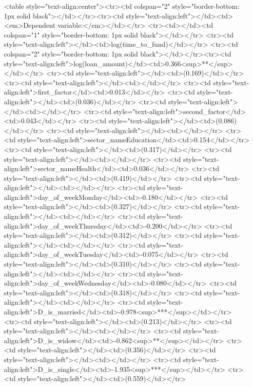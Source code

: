 
<table style="text-align:center"><tr><td colspan="2" style="border-bottom: 1px solid black"></td></tr><tr><td style="text-align:left"></td><td><em>Dependent variable:</em></td></tr>
<tr><td></td><td colspan="1" style="border-bottom: 1px solid black"></td></tr>
<tr><td style="text-align:left"></td><td>log(time_to_fund)</td></tr>
<tr><td colspan="2" style="border-bottom: 1px solid black"></td></tr><tr><td style="text-align:left">log(loan_amount)</td><td>0.366<sup>**</sup></td></tr>
<tr><td style="text-align:left"></td><td>(0.169)</td></tr>
<tr><td style="text-align:left"></td><td></td></tr>
<tr><td style="text-align:left">first_factor</td><td>0.013</td></tr>
<tr><td style="text-align:left"></td><td>(0.036)</td></tr>
<tr><td style="text-align:left"></td><td></td></tr>
<tr><td style="text-align:left">second_factor</td><td>0.043</td></tr>
<tr><td style="text-align:left"></td><td>(0.086)</td></tr>
<tr><td style="text-align:left"></td><td></td></tr>
<tr><td style="text-align:left">sector_nameEducation</td><td>0.154</td></tr>
<tr><td style="text-align:left"></td><td>(0.317)</td></tr>
<tr><td style="text-align:left"></td><td></td></tr>
<tr><td style="text-align:left">sector_nameHealth</td><td>0.036</td></tr>
<tr><td style="text-align:left"></td><td>(0.419)</td></tr>
<tr><td style="text-align:left"></td><td></td></tr>
<tr><td style="text-align:left">day_of_weekMonday</td><td>-0.180</td></tr>
<tr><td style="text-align:left"></td><td>(0.327)</td></tr>
<tr><td style="text-align:left"></td><td></td></tr>
<tr><td style="text-align:left">day_of_weekThursday</td><td>-0.200</td></tr>
<tr><td style="text-align:left"></td><td>(0.312)</td></tr>
<tr><td style="text-align:left"></td><td></td></tr>
<tr><td style="text-align:left">day_of_weekTuesday</td><td>-0.075</td></tr>
<tr><td style="text-align:left"></td><td>(0.310)</td></tr>
<tr><td style="text-align:left"></td><td></td></tr>
<tr><td style="text-align:left">day_of_weekWednesday</td><td>-0.080</td></tr>
<tr><td style="text-align:left"></td><td>(0.318)</td></tr>
<tr><td style="text-align:left"></td><td></td></tr>
<tr><td style="text-align:left">D_is_married</td><td>-0.978<sup>***</sup></td></tr>
<tr><td style="text-align:left"></td><td>(0.213)</td></tr>
<tr><td style="text-align:left"></td><td></td></tr>
<tr><td style="text-align:left">D_is_widow</td><td>-0.862<sup>**</sup></td></tr>
<tr><td style="text-align:left"></td><td>(0.356)</td></tr>
<tr><td style="text-align:left"></td><td></td></tr>
<tr><td style="text-align:left">D_is_single</td><td>-1.935<sup>***</sup></td></tr>
<tr><td style="text-align:left"></td><td>(0.559)</td></tr>
